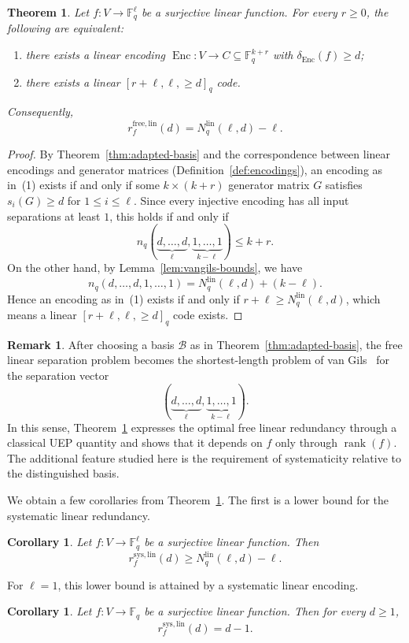 \documentclass[a4paper,12pt]{article}
\theoremstyle{plain}
\newtheorem{theorem}[lemma]{Theorem}
\newtheorem{corollary}[lemma]{Corollary}
\theoremstyle{definition}
\newtheorem{remark}[lemma]{Remark}
\newcommand{\F}{\mathbb F}
\newcommand{\Enc}{\operatorname{Enc}}
\newcommand{\rank}{\operatorname{rank}}
\newcommand{\Nlin}{N_q^{\mathrm{lin}}}
\begin{document}
\begin{theorem}
\label{thm:free-exact}
Let $f\colon V\to\F_q^\ell$ be a surjective linear function. For every $r\geq0$, the following are equivalent:
\begin{enumerate}
\item there exists a linear encoding $ \Enc\colon V\to C\subseteq\F_q^{k+r} $
with $\delta_{\Enc}(f)\geq d$;
\item there exists a linear $[r+\ell,\ell,\geq d]_q$ code.
\end{enumerate}
Consequently,
\[
r_f^{\mathrm{free,lin}}(d)
=
\Nlin(\ell,d)-\ell.
\]
\end{theorem}
\begin{proof}
By Theorem~\ref{thm:adapted-basis} and the correspondence between
linear encodings and generator matrices
(Definition~\ref{def:encodings}), an encoding as in~(1) exists if and
only if some $k\times(k+r)$ generator matrix $G$ satisfies
$s_i(G)\geq d$ for $1\leq i\leq\ell$. Since every injective encoding
has all input separations at least $1$, this holds if and only if
\[
n_q(\underbrace{d,\dots,d}_{\ell},\underbrace{1,\dots,1}_{k-\ell})
\leq k+r.
\]
On the other hand, by Lemma~\ref{lem:vangils-bounds},  we have
\[
n_q(d,\dots,d,1,\dots,1)
=
\Nlin(\ell,d)+(k-\ell).
\]
Hence an encoding as in~(1) exists if and only if
$r+\ell\geq\Nlin(\ell,d)$, which means a linear
$[r+\ell,\ell,\geq d]_q$ code exists.
\end{proof}
 
\begin{remark}
After choosing a basis $\mathcal{B}$ as in Theorem~\ref{thm:adapted-basis}, the free linear separation problem becomes the shortest-length problem of
van Gils~\cite[Definition~4]{vangils1983} for the separation vector
\[
(\underbrace{d,\dots,d}_{\ell},
 \underbrace{1,\dots,1}_{k-\ell}).
\]
In this sense, Theorem~\ref{thm:free-exact} expresses the optimal free linear redundancy through a classical UEP quantity and shows that it depends on
$f$ only through $\rank(f)$. The additional feature studied here is
the requirement of systematicity relative to the distinguished basis.
\end{remark}

We obtain a few corollaries from Theorem~\ref{thm:free-exact}. The first is a  lower bound for the systematic linear redundancy.

\begin{corollary}
\label{cor:systematic-lower}
Let $f\colon V\to\F_q^\ell$ be a surjective linear function. Then
\[
r_f^{\mathrm{sys,lin}}(d)
\geq
\Nlin(\ell,d)-\ell.
\]
\end{corollary}
For $\ell=1$, this lower bound is attained by a systematic linear encoding.
\begin{corollary} 
\label{cor:rank-one-coordinate}
Let $f\colon V\to\F_q$ be a surjective linear function. Then for every
$d\geq1$,
\[
r_f^{\mathrm{sys,lin}}(d)=d-1.
\] 
\end{corollary}
\end{document}
